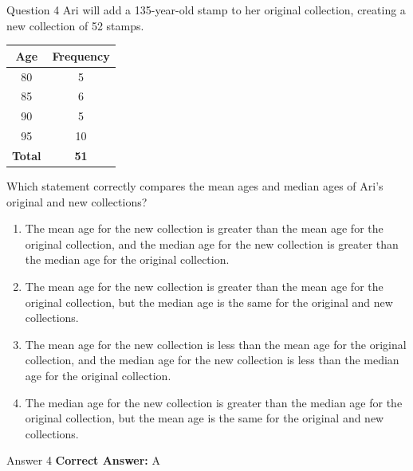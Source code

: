 \documentclass{beamer}
\begin{document}
\begin{frame}{Question 4}
\small
Ari will add a 135-year-old stamp to her original collection, creating a new collection of 52 stamps.

\begin{center}
\begin{tabular}{|c|c|}
\hline
Age & Frequency \\
\hline
80 & 5 \\
85 & 6 \\
90 & 5 \\
95 & 10 \\
\textbf{Total} & \textbf{51} \\
\hline
\end{tabular}
\end{center}

Which statement correctly compares the mean ages and median ages of Ari's original and new collections?
\vspace{0.35cm}
\begin{enumerate}
    \item[A.] The mean age for the new collection is greater than the mean age for the original collection, and the median age for the new collection is greater than the median age for the original collection.
    \item[B.] The mean age for the new collection is greater than the mean age for the original collection, but the median age is the same for the original and new collections.
    \item[C.] The mean age for the new collection is less than the mean age for the original collection, and the median age for the new collection is less than the median age for the original collection.
    \item[D.] The median age for the new collection is greater than the median age for the original collection, but the mean age is the same for the original and new collections.
\end{enumerate}
\end{frame}
\begin{frame}{Answer 4}
\small
\textbf{Correct Answer:} A
\end{frame}
\end{document}
